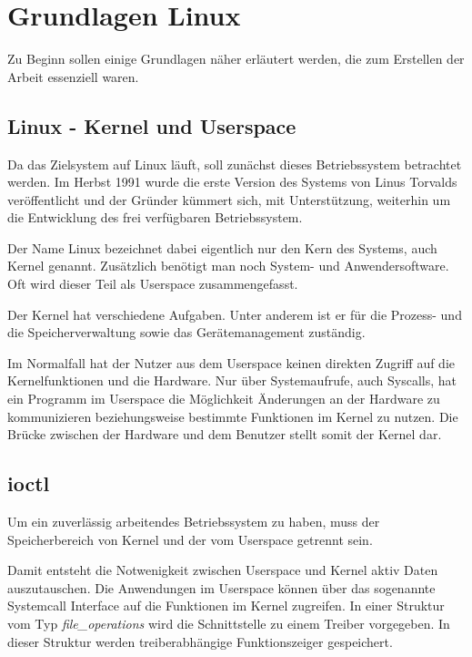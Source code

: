 \chapter{Grundlagen Linux} \label{sec:grund}
Zu Beginn sollen einige Grundlagen näher erläutert werden, die zum Erstellen der Arbeit essenziell waren.

\section{Linux - Kernel und Userspace}\label{sec:linux}
Da das Zielsystem auf Linux läuft, soll zunächst dieses Betriebssystem betrachtet werden. 
Im Herbst 1991 wurde die erste Version des Systems von Linus Torvalds veröffentlicht und der Gründer kümmert sich, mit Unterstützung, weiterhin um die Entwicklung des frei verfügbaren Betriebssystem. \citep[S. 53f.]{plotner2012linux}
 
Der Name Linux bezeichnet dabei eigentlich nur den Kern des Systems, auch Kernel genannt. Zusätzlich benötigt man noch System- und Anwendersoftware. Oft wird dieser Teil als Userspace zusammengefasst. \citep[S. 46]{plotner2012linux} 

Der Kernel hat verschiedene Aufgaben. Unter anderem ist er für die Prozess- und die Speicherverwaltung sowie das Gerätemanagement zuständig. \citep[S. 234]{schroder2009embedded} 

Im Normalfall hat der Nutzer aus dem Userspace keinen direkten Zugriff auf die Kernelfunktionen und die Hardware. Nur über Systemaufrufe, auch Syscalls, hat ein Programm im Userspace die Möglichkeit Änderungen an der Hardware zu kommunizieren beziehungsweise bestimmte Funktionen im Kernel zu nutzen. \citep[S. 124]{plotner2012linux} 
Die Brücke zwischen der Hardware und dem Benutzer stellt somit der Kernel dar.


\section{\acl{ioctl}}\label{sec:ioctl_t}
Um ein zuverlässig arbeitendes Betriebssystem zu haben, muss der Speicherbereich von Kernel und der vom Userspace getrennt sein. \citep[S. 233]{schroder2009embedded} %

Damit entsteht die Notwenigkeit zwischen Userspace und Kernel aktiv Daten auszutauschen. Die Anwendungen im Userspace können über das sogenannte Systemcall Interface auf die Funktionen im Kernel zugreifen. In einer Struktur vom Typ \textit{file\_operations} wird die Schnittstelle zu einem Treiber vorgegeben. In dieser Struktur werden treiberabhängige Funktionszeiger gespeichert. \citep[S. 249]{schroder2009embedded} %


